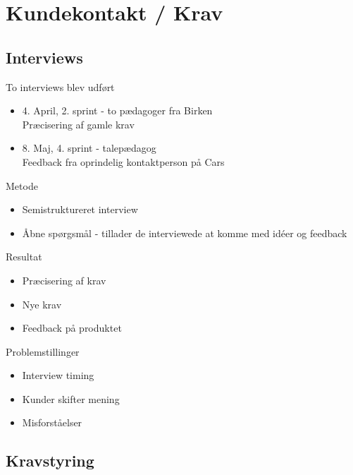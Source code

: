 \section{Kundekontakt / Krav}

\subsection{Interviews}

\begin{frame}
To interviews blev udført 

\begin{itemize}
\item 4. April, 2. sprint - to pædagoger fra Birken \\ Præcisering af gamle krav
\item 8. Maj, 4. sprint - talepædagog \\Feedback fra oprindelig kontaktperson på Cars 
\end{itemize}

\end{frame}

\begin{frame}{Metode}
\begin{itemize}
\item Semistruktureret interview 
\item Åbne spørgsmål - tillader de interviewede at komme med idéer og feedback
\end{itemize}
\end{frame}

\begin{frame}{Resultat}
\begin{itemize}
\item Præcisering af krav
\item Nye krav
\item Feedback på produktet
\end{itemize}
\end{frame}

\begin{frame}{Problemstillinger}
\begin{itemize}
\item Interview timing
\item Kunder skifter mening
\item Misforståelser
\end{itemize}
\end{frame}

\subsection{Kravstyring}


